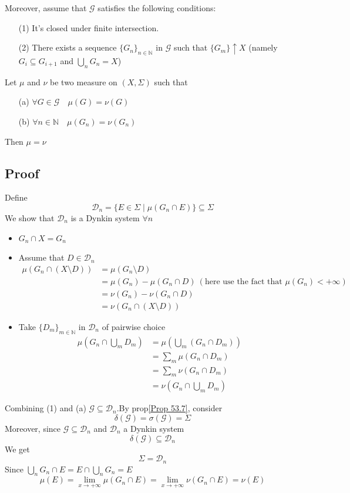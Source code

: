 \documentclass{book}
\begin{document}
Moreover, assume that $\mathcal{G}$ satisfies the following conditions:
\begin{itemize}
    \item [(1)]It's closed under finite intersection.
    \item [(2)]There exists a sequence $\{G_n\}_{n\in \mathbb{N}}$ in $\mathcal{G}$ such that $\{G_m\}\uparrow X$ (namely $G_i\subseteq G_{i+1}$ and $\bigcup\limits_nG_n=X$)
\end{itemize}
Let $\mu$ and $\nu$ be two measure on $(X,\Sigma)$ such that
\begin{itemize}
    \item [(a)]$\forall G\in \mathcal{G}\quad\mu(G)=\nu(G)$
    \item [(b)]$\forall n\in \mathbb{N}\quad \mu(G_n)=\nu(G_n)$
\end{itemize}
Then $\mu=\nu$
\subsection*{Proof}
Define
$$\mathscr{D}_n=\{E\in \Sigma\mid\mu(G_n\cap E)\}\subseteq\Sigma$$
We show that $\mathscr{D}_n$ is a Dynkin system $\forall n$\begin{itemize}
    \item $G_n\cap X=G_n$
    \item Assume that $D\in \mathscr{D}_n$
    $$\begin{aligned}
        \mu(G_n\cap(X\setminus D))&=\mu(G_n\setminus D)\\
        &=\mu(G_n)-\mu(G_n\cap D)\ (\text{here use the fact that }\mu(G_n)<+\infty)\\
        &=\nu(G_n)-\nu(G_n\cap D)\\
        &=\nu(G_n\cap(X\setminus D))
    \end{aligned}$$
    \item Take $\{D_m\}_{m\in\mathbb{N}}$ in $\mathscr{D}_n$ of pairwise choice
    $$\begin{aligned}
        \mu(G_n\cap\bigcup\limits_mD_m) &=\mu(\bigcup\limits_m(G_n\cap D_m))\\
        &=\sum\limits_m\mu(G_n\cap D_m)\\
        &=\sum\limits_m\nu(G_n\cap D_m)\\
        &=\nu(G_n\cap\bigcup\limits_mD_m)
    \end{aligned}$$
\end{itemize}
Combining (1) and (a) $\mathcal{G}\subseteq\mathscr{D}_n$.By prop\ref{Prop 53.7}, consider $$\delta(\mathcal{G})=\sigma(\mathcal{G})=\Sigma$$
Moreover, since $\mathcal{G}\subseteq\mathscr{D}_n$ and $\mathscr{D}_n$  a Dynkin system $$\delta(\mathcal{G})\subseteq\mathscr{D}_n$$
We get$$\Sigma=\mathscr{D}_n$$
Since $\bigcup\limits_nG_n\cap E=E\cap\bigcup\limits_nG_n=E$
$$\mu(E)=\lim\limits_{x\rightarrow+\infty}\mu(G_n\cap E)=\lim\limits_{x\rightarrow+\infty}\nu(G_n\cap E)=\nu(E)$$
\end{document}
